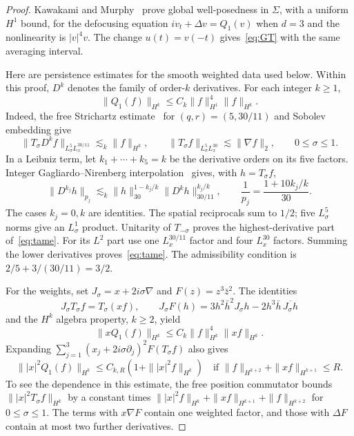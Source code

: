 \documentclass[11pt]{article}
\numberwithin{equation}{section}
\begin{document}
\begin{proof}
Kawakami and Murphy~\cite[Proposition~5.1]{KM} prove global well-posedness
in $\Sigma$, with a uniform $H^1$ bound, for the defocusing equation
$iv_t+\Delta v=Q_1(v)$ when $d=3$ and the nonlinearity is $|v|^4v$. The change
$u(t)=v(-t)$ gives~\eqref{eq:GT} with the same averaging interval.

Here are persistence estimates for the smooth weighted data used below.
Within this proof, $D^k$ denotes the family of order-$k$ derivatives.
For each integer $k\ge1$,
\begin{equation}\label{eq:tame}
 \|Q_1(f)\|_{H^k}\le C_k\|f\|_{H^1}^4\|f\|_{H^k}.
\end{equation}
Indeed, the free Strichartz estimate~\cite[Theorem~1.2]{KT} for
$(q,r)=(5,30/11)$ and Sobolev embedding give
\[
 \|T_\sigma D^kf\|_{L^5_\sigma L^{30/11}_x}\lesssim_k\|f\|_{H^k},
 \qquad
 \|T_\sigma f\|_{L^5_\sigma L^{30}_x}\lesssim\|\nabla f\|_2,
 \qquad 0\le\sigma\le1.
\]
In a Leibniz term, let $k_1+\cdots+k_5=k$ be the derivative orders on its
five factors. Integer Gagliardo--Nirenberg interpolation~\cite[p.~125]{N}
gives, with $h=T_\sigma f$,
\[
 \|D^{k_j}h\|_{p_j}
 \lesssim_k\|h\|_{30}^{1-k_j/k}\|D^kh\|_{30/11}^{k_j/k},
 \qquad \frac1{p_j}=\frac{1+10k_j/k}{30}.
\]
The cases $k_j=0,k$ are identities. The spatial reciprocals sum to $1/2$;
five $L^5_\sigma$ norms give an $L^1_\sigma$ product. Unitarity of
$T_{-\sigma}$ proves the highest-derivative part of~\eqref{eq:tame}.
For its $L^2$ part use one $L^{30/11}_x$ factor and four $L^{30}_x$ factors.
Summing the lower derivatives proves~\eqref{eq:tame}. The admissibility
condition is $2/5+3/(30/11)=3/2$.

For the weights, set $J_\sigma=x+2i\sigma\nabla$ and $F(z)=z^3\bar z^2$.
The identities
\[
 J_\sigma T_\sigma f=T_\sigma(xf),\qquad
 J_\sigma F(h)=3h^2\bar h^2J_\sigma h
                 -2h^3\bar h\,\overline{J_\sigma h}
\]
and the $H^k$ algebra property, $k\ge2$, yield
\begin{equation}\label{eq:firstweight}
 \|xQ_1(f)\|_{H^k}\le C_k\|f\|_{H^k}^4\|xf\|_{H^k}.
\end{equation}
Expanding $\sum_{j=1}^3(x_j+2i\sigma\partial_j)^2F(T_\sigma f)$ also gives
\begin{equation}\label{eq:secondweight}
 \||x|^2Q_1(f)\|_{H^k}\le C_{k,R}(1+\||x|^2f\|_{H^k})
 \quad\text{if }\|f\|_{H^{k+2}}+\|xf\|_{H^{k+1}}\le R.
\end{equation}
To see the dependence in this estimate, the free position commutator bounds
$\||x|^2T_\sigma f\|_{H^k}$ by a constant times
$\||x|^2f\|_{H^k}+\|xf\|_{H^{k+1}}+\|f\|_{H^{k+2}}$ for $0\le\sigma\le1$.
The terms with $x\nabla F$ contain one weighted factor, and those with
$\Delta F$ contain at most two further derivatives.


\end{proof}
\end{document}
